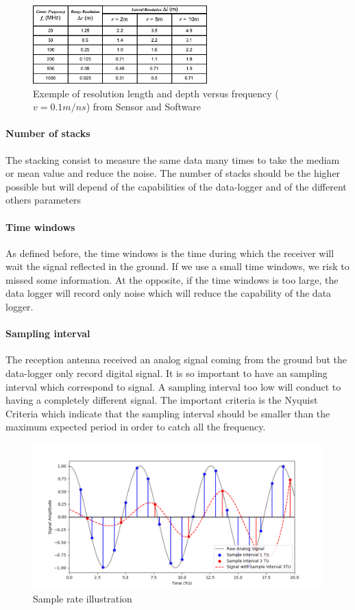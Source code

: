\begin{figure}[h]
    \centering
    \includegraphics[width=0.6\textwidth]{Images/00_Theory/SS_FrequencyDepthResolution.jpg}
    \caption{Exemple of resolution length and depth versus frequency ($v=0.1m/ns$) from Sensor and Software \cite{UnderstandingDetection}}
    \label{fig:GPRFrequency}
\end{figure}

\paragraph{Number of stacks} The stacking consist to measure the same data many times to take the mediam or mean value and reduce the noise. The number of stacks should be the higher possible but will depend of the capabilities of the data-logger and of the different others parameters

\paragraph{Time windows} As defined before, the time windows is the time during which the receiver will wait the signal reflected in the ground. If we use a small time windows, we risk to missed some information. At the opposite, if the time windows is too large, the data logger will record only noise which will reduce the capability of the data logger.

\paragraph{Sampling interval} The reception antenna received an analog signal coming from the ground but the data-logger only record digital signal. It is so important to have an sampling interval which correspond to signal. A sampling interval too low will conduct to having a completely different signal. The important criteria is the Nyquist Criteria which indicate that the sampling interval should be smaller than the maximum expected period in order to catch all the frequency. 

\begin{figure}[H]
    \centering
    \includegraphics[width=0.8\linewidth]{Images/00_Theory/SampleRate.png}
    \caption{Sample rate illustration}
    \label{fig:SampleRate}
\end{figure}

